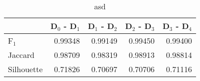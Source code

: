\begin{table}
\centering
\caption{asd}
\label{tab:s1-cont-eca-combined}
\begin{tabular}{lrrrr}
\toprule
{} &  D$_0$ - D$_1$ &  D$_1$ - D$_2$ &  D$_2$ - D$_3$ &  D$_3$ - D$_4$ \\
\midrule
F$_1$      &        0.99348 &        0.99149 &        0.99450 &        0.99400 \\
Jaccard    &        0.98709 &        0.98319 &        0.98913 &        0.98814 \\
Silhouette &        0.71826 &        0.70697 &        0.70706 &        0.71116 \\
\bottomrule
\end{tabular}
\end{table}
